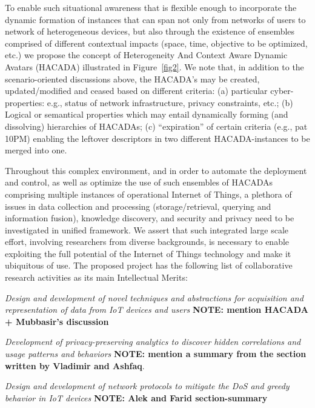 To enable such situational awareness that is flexible enough to incorporate the dynamic formation of instances that can span not only from networks of users to network of heterogeneous devices, but also through the existence of ensembles comprised of different contextual impacts (space, time, objective to be optimized, etc.) we  propose the concept of Heterogeneity And Context Aware Dynamic Avatars (HACADA) illustrated in Figure~\ref{fig2}. We note that, in addition to the scenario-oriented discussions above, the HACADA's may be created, updated/modified and ceased based on different criteria: (a) particular cyber-properties: e.g., status of network infrastructure, privacy constraints, etc.; (b) Logical or semantical properties which may entail dynamically forming (and dissolving) hierarchies of HACADAs; (c) ``expiration'' of certain criteria (e.g., pat 10PM) enabling the leftover descriptors in two different HACADA-instances to be merged into one.



Throughout this complex environment, and in order to automate the deployment and control, as well as optimize the use of such ensembles of HACADAs comprising multiple instances of operational Internet of Things,
a plethora of issues in data collection and processing (storage/retrieval, querying and information fusion), knowledge discovery, and security and privacy need to be investigated in unified framework. We assert that  such integrated large scale effort, involving researchers from diverse backgrounds, is necessary to  enable exploiting the full potential of the Internet of Things technology  and make it ubiquitous of use. The proposed project has the following list of collaborative research activities as its main Intellectual Merits:

{\it Design and development of novel techniques and abstractions for acquisition and representation of data from IoT devices and users} {\bf NOTE: mention HACADA + Mubbasir's discussion}

{\it Development of privacy-preserving analytics to discover hidden correlations and usage patterns and behaviors} {\bf NOTE: mention a summary from the section written by Vladimir and Ashfaq}.

{\it Design and development of network protocols to mitigate the DoS and greedy behavior in IoT devices} {\bf NOTE: Alek and Farid section-summary} 


